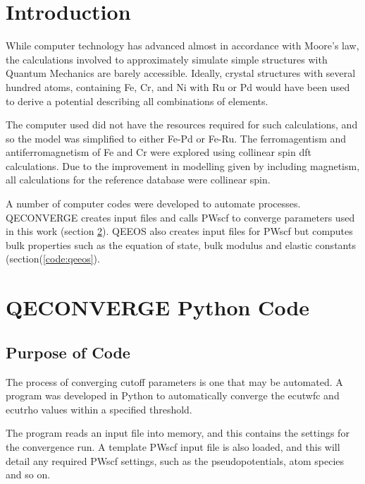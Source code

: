 \section{Introduction}

While computer technology has advanced almost in accordance with Moore's law, the calculations involved to approximately simulate simple structures with Quantum Mechanics are barely accessible.  Ideally, crystal structures with several hundred atoms, containing Fe, Cr, and Ni with Ru or Pd would have been used to derive a potential describing all combinations of elements.  

The computer used did not have the resources required for such calculations, and so the model was simplified to either Fe-Pd or Fe-Ru.  The ferromagentism and antiferromagnetism of Fe and Cr were explored using collinear spin \acrshort{dft} calculations.  Due to the improvement in modelling given by including magnetism, all calculations for the reference database were collinear spin.

A number of computer codes were developed to automate processes.  QECONVERGE creates input files and calls PWscf to converge parameters used in this work (section \ref{code:qeconverge}).  QEEOS also creates input files for PWscf but computes bulk properties such as the equation of state, bulk modulus and elastic constants (section(\ref{code:qeeos}).





\FloatBarrier
\section{QECONVERGE Python Code}
\label{code:qeconverge}

\subsection{Purpose of Code}

The process of converging cutoff parameters is one that may be automated.  A program was developed in Python to automatically converge the ecutwfc and ecutrho values within a specified threshold.

The program reads an input file into memory, and this contains the settings for the convergence run.  A template PWscf input file is also loaded, and this will detail any required PWscf settings, such as the pseudopotentials, atom species and so on.  

